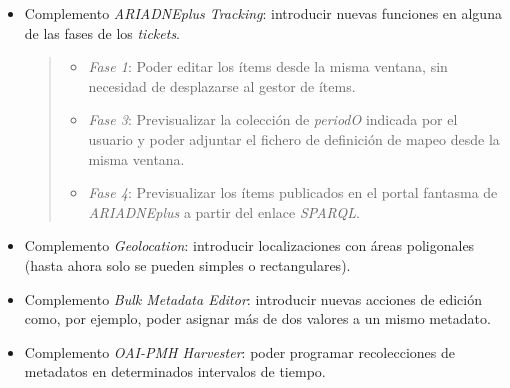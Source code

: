 \documentclass[
]{article}
\providecommand{\tightlist}{%
  \setlength{\itemsep}{0pt}\setlength{\parskip}{0pt}}
\begin{document}
\begin{itemize}
\item
  Complemento \emph{ARIADNEplus Tracking}: introducir nuevas funciones
  en alguna de las fases de los \emph{tickets}.

  \begin{quote}
  \begin{itemize}
  \tightlist
  \item
    \emph{Fase 1}: Poder editar los ítems desde la misma ventana, sin
    necesidad de desplazarse al gestor de ítems.
  \item
    \emph{Fase 3}: Previsualizar la colección de \emph{periodO} indicada
    por el usuario y poder adjuntar el fichero de definición de mapeo
    desde la misma ventana.
  \item
    \emph{Fase 4}: Previsualizar los ítems publicados en el portal
    fantasma de \emph{ARIADNEplus} a partir del enlace \emph{SPARQL}.
  \end{itemize}
  \end{quote}
\item
  Complemento \emph{Geolocation}: introducir localizaciones con áreas
  poligonales (hasta ahora solo se pueden simples o rectangulares).
\item
  Complemento \emph{Bulk Metadata Editor}: introducir nuevas acciones de
  edición como, por ejemplo, poder asignar más de dos valores a un mismo
  metadato.
\item
  Complemento \emph{OAI-PMH Harvester}: poder programar recolecciones de
  metadatos en determinados intervalos de tiempo.
\end{itemize}
\end{document}
